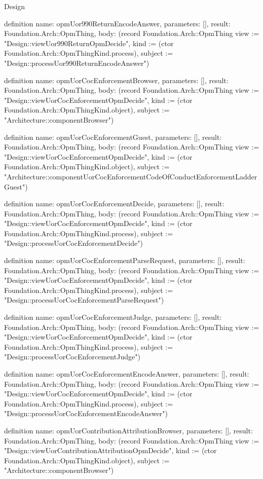 \begin{lexlean}{Design}
\begin{semanticmodule}
definition{
  name: opmUor990ReturnEncodeAnswer,
  parameters: [],
  result: Foundation.Arch::OpmThing,
  body: (record Foundation.Arch::OpmThing {view := "Design::viewUor990ReturnOpmDecide", kind := (ctor Foundation.Arch::OpmThingKind.process), subject := "Design::processUor990ReturnEncodeAnswer"})
}

definition{
  name: opmUorCocEnforcementBrowser,
  parameters: [],
  result: Foundation.Arch::OpmThing,
  body: (record Foundation.Arch::OpmThing {view := "Design::viewUorCocEnforcementOpmDecide", kind := (ctor Foundation.Arch::OpmThingKind.object), subject := "Architecture::componentBrowser"})
}

definition{
  name: opmUorCocEnforcementGuest,
  parameters: [],
  result: Foundation.Arch::OpmThing,
  body: (record Foundation.Arch::OpmThing {view := "Design::viewUorCocEnforcementOpmDecide", kind := (ctor Foundation.Arch::OpmThingKind.object), subject := "Architecture::componentUorCocEnforcementCodeOfConductEnforcementLadderGuest"})
}

definition{
  name: opmUorCocEnforcementDecide,
  parameters: [],
  result: Foundation.Arch::OpmThing,
  body: (record Foundation.Arch::OpmThing {view := "Design::viewUorCocEnforcementOpmDecide", kind := (ctor Foundation.Arch::OpmThingKind.process), subject := "Design::processUorCocEnforcementDecide"})
}

definition{
  name: opmUorCocEnforcementParseRequest,
  parameters: [],
  result: Foundation.Arch::OpmThing,
  body: (record Foundation.Arch::OpmThing {view := "Design::viewUorCocEnforcementOpmDecide", kind := (ctor Foundation.Arch::OpmThingKind.process), subject := "Design::processUorCocEnforcementParseRequest"})
}

definition{
  name: opmUorCocEnforcementJudge,
  parameters: [],
  result: Foundation.Arch::OpmThing,
  body: (record Foundation.Arch::OpmThing {view := "Design::viewUorCocEnforcementOpmDecide", kind := (ctor Foundation.Arch::OpmThingKind.process), subject := "Design::processUorCocEnforcementJudge"})
}

definition{
  name: opmUorCocEnforcementEncodeAnswer,
  parameters: [],
  result: Foundation.Arch::OpmThing,
  body: (record Foundation.Arch::OpmThing {view := "Design::viewUorCocEnforcementOpmDecide", kind := (ctor Foundation.Arch::OpmThingKind.process), subject := "Design::processUorCocEnforcementEncodeAnswer"})
}

definition{
  name: opmUorContributionAttributionBrowser,
  parameters: [],
  result: Foundation.Arch::OpmThing,
  body: (record Foundation.Arch::OpmThing {view := "Design::viewUorContributionAttributionOpmDecide", kind := (ctor Foundation.Arch::OpmThingKind.object), subject := "Architecture::componentBrowser"})
}


\end{semanticmodule}
\end{lexlean}
